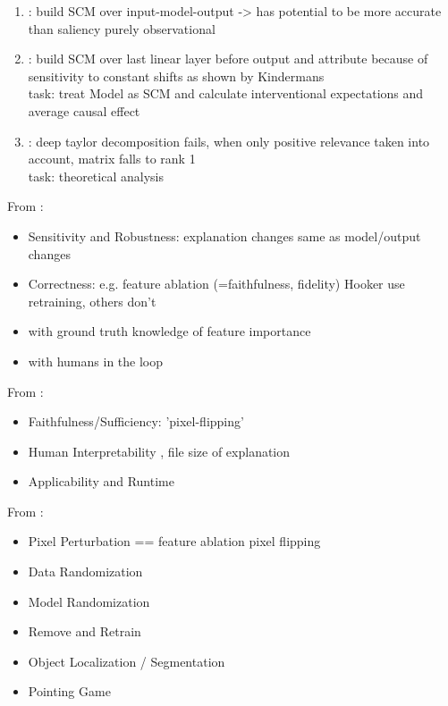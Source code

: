 {\begin{enumerate}
      \item \cite{Narendra2018}: build SCM over input-model-output -> has potential to be more accurate than saliency purely observational
      \item \cite{Chattopadhyay2019}: build SCM over last linear layer before output and attribute because of sensitivity to constant shifts as shown by Kindermans
            \\ task: treat Model as SCM and calculate interventional expectations and average causal effect
      \item \cite{Sixt2022}: deep taylor decomposition fails, when only positive relevance taken into account, matrix falls to rank 1 \\ task: theoretical analysis
\end{enumerate}
}


From \cite{Yang2019}:
\begin{itemize}
    \item Sensitivity and Robustness: explanation changes same as model/output changes \cite{Adebayo2018,Ghorbani2019a}
    \item Correctness: e.g. feature ablation (=faithfulness, fidelity) \cite{Samek2017a,Fong2017,Hooker2019} Hooker use retraining, others don't
    \item with ground truth knowledge of feature importance \cite{Kim2018, Yang2019, Clark2023,Arras2022,Bau2017,Parafita2019,Singla2022}
    \item with humans in the loop \cite{Singla2022, Ribeiro2016, Rong2023,Kim2018}
\end{itemize}

From \cite{Samek2021}:
\begin{itemize}
    \item Faithfulness/Sufficiency: 'pixel-flipping' \cite{Samek2017}
    \item Human Interpretability \cite{Kim2018}, file size of explanation
    \item Applicability and Runtime
\end{itemize}

From \cite{Arras2022}:
\begin{itemize}
    \item Pixel Perturbation == feature ablation pixel flipping \cite{Samek2017a, Samek2021, Bach2015, Lundberg2017}
    \item Data Randomization \cite{Adebayo2018}
    \item Model Randomization \cite{Adebayo2018,Sixt2020}
    \item Remove and Retrain \cite{Hooker2019}
    \item Object Localization / Segmentation \cite{Simonyan2014}
    \item Pointing Game
\end{itemize}


